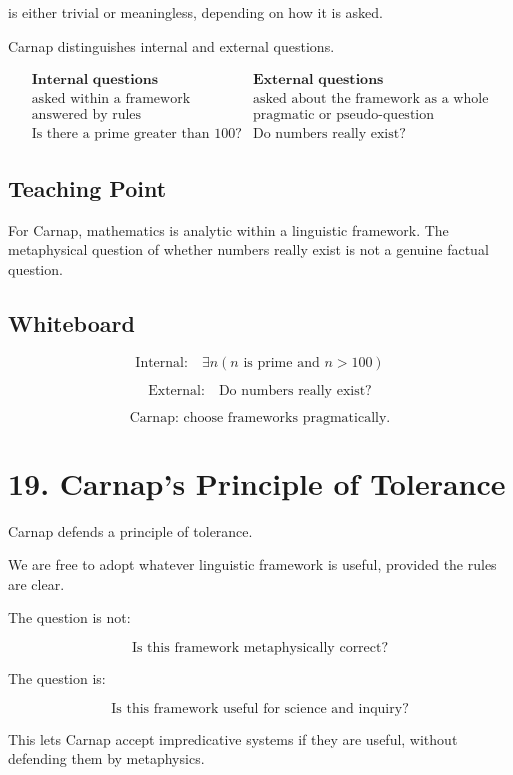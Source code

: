 \documentclass[11pt]{article}
\begin{document}
is either trivial or meaningless, depending on how it is asked.

Carnap distinguishes internal and external questions.

\[
\begin{array}{c|c}
\textbf{Internal questions} & \textbf{External questions} \\
\hline
\text{asked within a framework} & \text{asked about the framework as a whole} \\
\text{answered by rules} & \text{pragmatic or pseudo-question} \\
\text{Is there a prime greater than 100?} & \text{Do numbers really exist?}
\end{array}
\]

\subsection*{Teaching Point}

For Carnap, mathematics is analytic within a linguistic framework. The metaphysical
question of whether numbers really exist is not a genuine factual question.

\subsection*{Whiteboard}

\[
\text{Internal:}
\quad
\exists n(n \text{ is prime and } n>100)
\]

\[
\text{External:}
\quad
\text{Do numbers really exist?}
\]

\[
\text{Carnap: choose frameworks pragmatically.}
\]

\section*{19. Carnap's Principle of Tolerance}

Carnap defends a principle of tolerance.

We are free to adopt whatever linguistic framework is useful, provided the rules are clear.

The question is not:

\[
\text{Is this framework metaphysically correct?}
\]

The question is:

\[
\text{Is this framework useful for science and inquiry?}
\]

This lets Carnap accept impredicative systems if they are useful, without defending them
by metaphysics.
\end{document}
